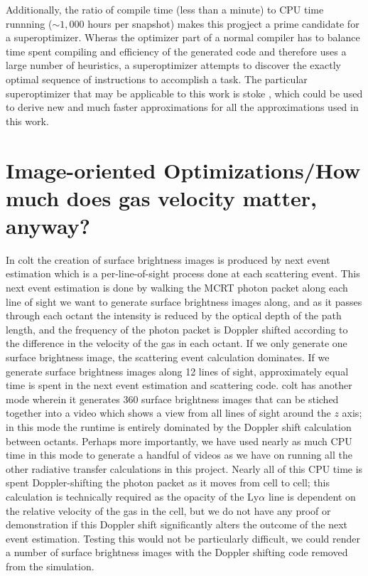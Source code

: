 Additionally, the ratio of compile time (less than a minute) to CPU time runnning ($\sim1,000$ hours per snapshot) makes this progject a prime candidate for a superoptimizer.
Wheras the optimizer part of a normal compiler has to balance time spent compiling and efficiency of the generated code and therefore uses a large number of heuristics, a superoptimizer attempts to discover the exactly optimal sequence of instructions to accomplish a task.
The particular superoptimizer that may be applicable to this work is {\sc stoke} \citep{stoke}, which could be used to derive new and much faster approximations for all the approximations used in this work.


\section{Image-oriented Optimizations/How much does gas velocity matter, anyway?}
In {\sc colt} the creation of surface brightness images is produced by next event estimation which is a per-line-of-sight process done at each scattering event.
This next event estimation is done by walking the MCRT photon packet along each line of sight we want to generate surface brightness images along, and as it passes through each octant the intensity is reduced by the optical depth of the path length, and the frequency of the photon packet is Doppler shifted according to the difference in the velocity of the gas in each octant.
If we only generate one surface brightness image, the scattering event calculation dominates.
If we generate surface brightness images along 12 lines of sight, approximately equal time is spent in the next event estimation and scattering code.
{\sc colt} has another mode wherein it generates 360 surface brightness images that can be stiched together into a video which shows a view from all lines of sight around the $z$ axis; in this mode the runtime is entirely dominated by the Doppler shift calculation between octants.
Perhaps more importantly, we have used nearly as much CPU time in this mode to generate a handful of videos as we have on running all the other radiative transfer calculations in this project.
Nearly all of this CPU time is spent Doppler-shifting the photon packet as it moves from cell to cell; this calculation is technically required as the opacity of the Ly$\alpha$ line is dependent on the relative velocity of the gas in the cell, but we do not have any proof or demonstration if this Doppler shift significantly alters the outcome of the next event estimation.
Testing this would not be particularly difficult, we could render a number of surface brightness images with the Doppler shifting code removed from the simulation.

